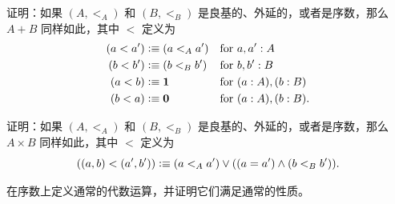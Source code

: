 \begin{ex}\label{ex:add-ordinals}
  证明：如果 $(A,<_A)$ 和 $(B,<_B)$ 是良基的、外延的，或者是序数，那么 $A+B$ 同样如此，其中 $<$ 定义为
  \begin{align*}
    (a<a') &\vcentcolon\equiv (a<_A a') & \text{for }& a,a':A\\
    (b<b') &\vcentcolon\equiv (b<_B b') & \text{for }& b,b':B\\
    (a<b) &\vcentcolon\equiv \mathbf{1}      & \text{for }& (a:A),(b:B)\\
    (b<a) &\vcentcolon\equiv \mathbf{0}    & \text{for }& (a:A),(b:B).
  \end{align*}
\end{ex}



\begin{ex}\label{ex:multiply-ordinals}
  证明：如果 $(A,<_A)$ 和 $(B,<_B)$ 是良基的、外延的，或者是序数，那么 $A\times B$ 同样如此，其中 $<$ 定义为
  \[ ((a,b) <(a',b')) \vcentcolon\equiv (a<_A a') \vee ((a=a') \wedge (b<_B b')). \]
\end{ex}



\begin{ex}\label{ex:algebraic-ordinals}
  在序数上定义通常的代数运算，并证明它们满足通常的性质。
\end{ex}

